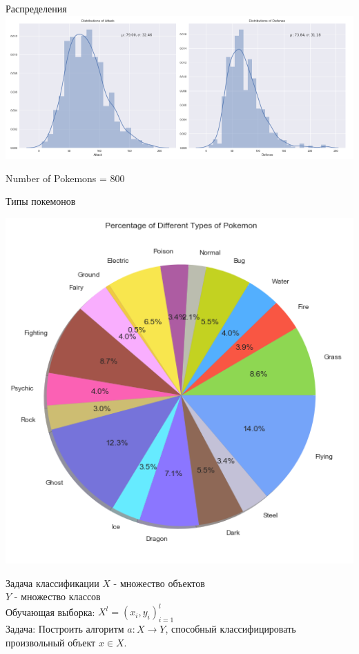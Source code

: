 \documentclass[10pt]{beamer}
\begin{document}
\begin{frame}{Распределения}
  \centering
	\includegraphics[width=\textwidth]{images/attack_defense}
	
	Number of Pokemons = 800
\end{frame}

{
\begin{frame}{Типы покемонов}
  \begin{center}
	  \includegraphics[width=\linewidth,height=0.8 \textheight,keepaspectratio]{images/pokemons_by_type}
  \end{center}
\end{frame}
}

\begin{frame}{Задача классификации}
	$X$ - множество объектов \\
	$Y$ - множество классов \\
	Обучающая выборка: ${X^l = (x_i, y_i)_{i=1}^l}$ \\ 
	\bigbreak
	\bigbreak
	\alert{Задача}: Построить алгоритм ${a \colon X \rightarrow Y}$, способный классифицировать произвольный объект ${x \in X}$.
\end{frame}
\end{document}
